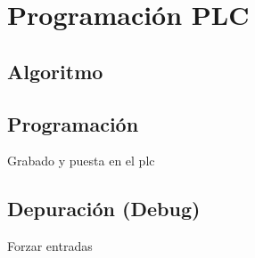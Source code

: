 \chapter{Programación PLC}
\label{ch:progPLC}

\section{Algoritmo}
\label{sec:Algoritmo}

\section{Programación}
\label{sec:Programacion}
Grabado y puesta en el plc

\section{Depuración (Debug)}
\label{sec:Debug}
Forzar entradas
